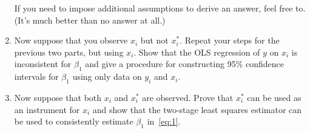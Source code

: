 \begin{hw}
\begin{enumerate}
    If you need to impose additional assumptions to derive an answer,
    feel free to. (It's much better than no answer at all.)

  \item Now suppose that you observe $x_i$ but not $x_i^*$.  Repeat
    your steps for the previous two parts, but using $x_i$.  Show that
    the OLS regression of $y$ on $x_i$ is inconsistent for $\beta_1$
    and give a procedure for constructing 95\% confidence intervals
    for $\beta_1$ using only data on $y_i$ and $x_i$.

  \item Now suppose that both $x_i$ and $x_i^*$ are observed. Prove
    that $x_i^*$ can be used as an instrument for $x_i$ and show that
    the two-stage least squares estimator can be used to consistently
    estimate $\beta_1$ in~\eqref{eq:1}.

  \end{enumerate}
\end{hw}

